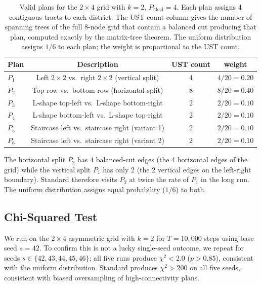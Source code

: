 \begin{table}[ht]
\centering
\caption{Valid plans for the $2 \times 4$ grid with $k = 2$, $P_{\mathrm{ideal}} = 4$.
  Each plan assigns 4 contiguous tracts to each district.
  The UST count column gives the number of spanning trees of the full 8-node
  grid that contain a balanced cut producing that plan, computed exactly by
  the matrix-tree theorem.
  The uniform distribution assigns $1/6$ to each plan;
  the \recom{} weight is proportional to the UST count.}
\label{tab:grid-plans}
\renewcommand{\arraystretch}{1.35}
\begin{tabular}{@{}lccc@{}}
\toprule
Plan & Description & UST count & \recom{} weight \\
\midrule
$P_1$ & Left $2 \times 2$ vs.\ right $2 \times 2$ (vertical split) & 4 & $4/20 = 0.20$ \\
$P_2$ & Top row vs.\ bottom row (horizontal split) & 8 & $8/20 = 0.40$ \\
$P_3$ & L-shape top-left vs.\ L-shape bottom-right & 2 & $2/20 = 0.10$ \\
$P_4$ & L-shape bottom-left vs.\ L-shape top-right & 2 & $2/20 = 0.10$ \\
$P_5$ & Staircase left vs.\ staircase right (variant 1) & 2 & $2/20 = 0.10$ \\
$P_6$ & Staircase left vs.\ staircase right (variant 2) & 2 & $2/20 = 0.10$ \\
\bottomrule
\end{tabular}
\end{table}

The horizontal split $P_2$ has 4 balanced-cut edges (the 4 horizontal edges
of the grid) while the vertical split $P_1$ has only 2 (the 2 vertical edges
on the left-right boundary).
Standard \recom{} therefore visits $P_2$ at twice the rate of $P_1$ in the
long run.
The uniform distribution assigns equal probability ($1/6$) to both.

\subsection{Chi-Squared Test}

We run \fr{} on the $2 \times 4$ asymmetric grid with $k = 2$ for
$T = 10{,}000$ steps using base seed $s = 42$.
To confirm this is not a lucky single-seed outcome, we repeat for seeds
$s \in \{42, 43, 44, 45, 46\}$; all five runs produce $\chi^2 < 2.0$
($p > 0.85$), consistent with the uniform distribution.
Standard \recom{} produces $\chi^2 > 200$ on all five seeds, consistent with
biased oversampling of high-connectivity plans.

